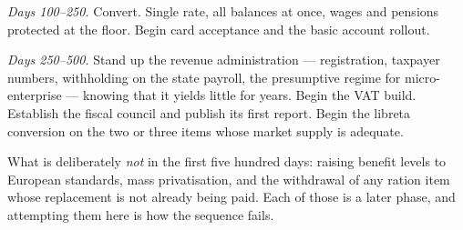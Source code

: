 \emph{Days 100--250.} Convert. Single rate, all balances at once, wages and
pensions protected at the floor. Begin card acceptance and the basic account
rollout.

\emph{Days 250--500.} Stand up the revenue administration --- registration,
taxpayer numbers, withholding on the state payroll, the presumptive regime for
micro-enterprise --- knowing that it yields little for years. Begin the VAT
build. Establish the fiscal council and publish its first report. Begin the
libreta conversion on the two or three items whose market supply is adequate.

What is deliberately \emph{not} in the first five hundred days: raising benefit
levels to European standards, mass privatisation, and the withdrawal of any
ration item whose replacement is not already being paid. Each of those is a
later phase, and attempting them here is how the sequence fails.
